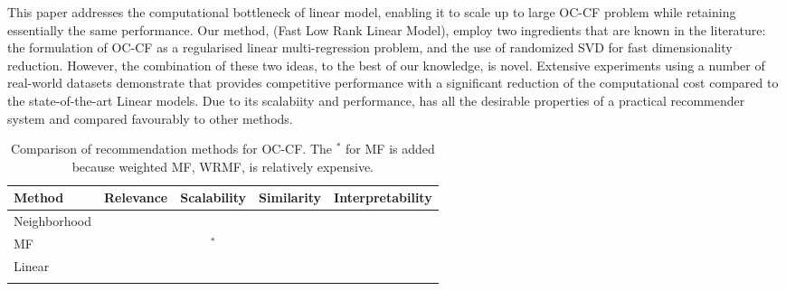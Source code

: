 This paper addresses the computational bottleneck of linear model, enabling it to scale up to large OC-CF problem while retaining essentially
the same performance. Our method, \LinearLow (Fast Low Rank Linear Model), employ two ingredients that are known in the literature: 
the formulation of OC-CF as a regularised linear multi-regression problem, and the use of randomized SVD for fast dimensionality reduction. 
However, the combination of these two ideas, to the best of our knowledge, is novel. 
Extensive experiments using a number of real-world datasets demonstrate that \LinearLow provides competitive performance with a significant reduction of the computational cost compared to the state-of-the-art Linear models. 
Due to its scalabiity and performance, 
\LinearLow has all the desirable properties of a practical recommender system and compared favourably to other methods.
\begin{table*}[!t]
	\centering

		\begin{tabular}{llccc}
		\toprule
		\toprule	
		\textbf{Method} & \textbf{Relevance} & \textbf{Scalability} & \textbf{Similarity} & \textbf{Interpretability} \\
		\toprule
		Neighborhood & \cross & \tick & \tick & \tick \\
		MF & \cross & \tick$^*$  & \cross & \cross \\
		Linear & \tick & \cross & \tick & \tick \\
		\LinearLow & \tick & \tick & \tick & \tick \\
		\bottomrule
		\end{tabular}
	\caption{Comparison of recommendation methods for OC-CF. The $^*$ for MF is added because weighted MF, WRMF, is relatively expensive.}
	\label{tbl:comparison}
\end{table*}
